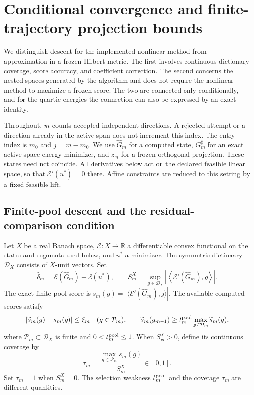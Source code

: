 \documentclass[11pt]{article}
\theoremstyle{remark}
\begin{document}
\setcounter{section}{4}
\fi
\providecommand{\cE}{\mathcal E}
\providecommand{\cD}{\mathcal D}
\providecommand{\cP}{\mathcal P}
\providecommand{\cK}{\mathcal K}
\providecommand{\cnorm}[1]{\left\lVert#1\right\rVert}
\providecommand{\cabs}[1]{\left|#1\right|}
\providecommand{\cinner}[2]{\left\langle#1,#2\right\rangle}
\providecommand{\cdd}{\,\mathrm d}
\providecommand{\cR}{\mathbb R}

\section{Conditional convergence and finite-trajectory projection bounds}
\label{sec:c5}

We distinguish descent for the implemented nonlinear method from approximation
in a frozen Hilbert metric. The first involves continuous-dictionary coverage,
score accuracy, and coefficient correction. The second concerns the nested
spaces generated by the algorithm and does not require the nonlinear method to
maximize a frozen score. The two are connected only conditionally, and for the
quartic energies the connection can also be expressed by an exact identity.

Throughout, $m$ counts accepted independent directions. A rejected attempt or
a direction already in the active span does not increment this index.
The entry index is $m_0$ and $j=m-m_0$. We use $\widehat G_m$ for a computed
state, $G_m^\sharp$ for an exact active-space energy minimizer, and $z_m$
for a frozen orthogonal projection. These states need not coincide.
All derivatives below act on the declared feasible linear space, so that
$\cE'(u^*)=0$ there. Affine constraints are reduced to this setting by a
fixed feasible lift.

\subsection{Finite-pool descent and the residual-comparison condition}
\label{sec:c5-descent}

Let $X$ be a real Banach space, $\cE:X\to\cR$ a differentiable convex
functional on the states and segments used below, and $u^*$ a minimizer.
The symmetric dictionary $\cD_X$ consists of $X$-unit vectors. Set
\[
 \widehat\delta_m=\cE(\widehat G_m)-\cE(u^*),\qquad
 S_m^X=\sup_{g\in\cD_X}\cabs{\cinner{\cE'(\widehat G_m)}g}.
\]
The exact finite-pool score is $s_m(g)=|\langle\cE'(\widehat G_m),g\rangle|$.
The available computed scores satisfy
\begin{equation}
 \cabs{\widetilde s_m(g)-s_m(g)}\leq\xi_m\quad(g\in\cP_m),\qquad
 \widetilde s_m(g_{m+1})\geq t_m^{\rm pool}
                  \max_{g\in\cP_m}\widetilde s_m(g),
 \label{eq:c5-oracle}
\end{equation}
where $\cP_m\subset\cD_X$ is finite and $0<t_m^{\rm pool}\leq1$.
When $S_m^X>0$, define its continuous coverage by
\begin{equation}
 \tau_m=\frac{\max_{g\in\cP_m}s_m(g)}{S_m^X}\in[0,1].
 \label{eq:c5-coverage}
\end{equation}
Set $\tau_m=1$ when $S_m^X=0$. The selection weakness $t_m^{\rm pool}$
and the coverage $\tau_m$ are different quantities.
\end{document}
